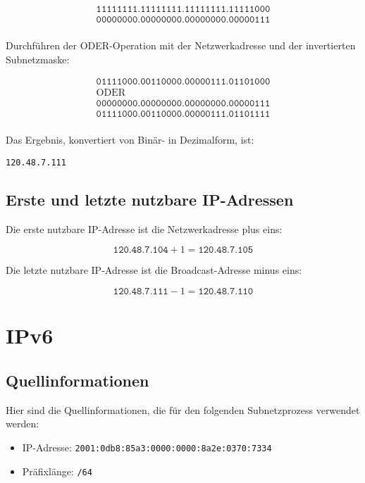 \documentclass{article}
\begin{document}
\[
\begin{array}{c}
\texttt{11111111.11111111.11111111.11111000} \\
\hline
\texttt{00000000.00000000.00000000.00000111} \\
\end{array}
\]

Durchführen der ODER-Operation mit der Netzwerkadresse und der invertierten Subnetzmaske:

\[
\begin{array}{c}
\texttt{01111000.00110000.00000111.01101000} \\
\text{ODER} \\
\texttt{00000000.00000000.00000000.00000111} \\
\hline
\texttt{01111000.00110000.00000111.01101111} \\
\end{array}
\]

Das Ergebnis, konvertiert von Binär- in Dezimalform, ist:

\texttt{120.48.7.111}

\subsection*{Erste und letzte nutzbare IP-Adressen}

Die erste nutzbare IP-Adresse ist die Netzwerkadresse plus eins:

\[
\texttt{120.48.7.104} + 1 = \texttt{120.48.7.105}
\]

Die letzte nutzbare IP-Adresse ist die Broadcast-Adresse minus eins:

\[
\texttt{120.48.7.111} - 1 = \texttt{120.48.7.110}
\]

\newpage

\section*{IPv6}

\subsection*{Quellinformationen}

Hier sind die Quellinformationen, die für den folgenden Subnetzprozess verwendet werden:

\begin{itemize}
    \item IP-Adresse: \texttt{2001:0db8:85a3:0000:0000:8a2e:0370:7334}
    \item Präfixlänge: \texttt{/64}
\end{itemize}
\end{document}
